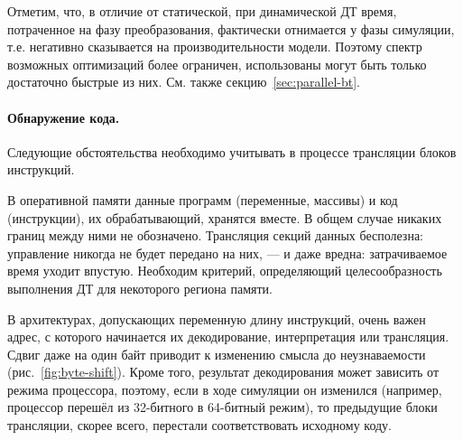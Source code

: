 Отметим, что, в отличие от статической, при динамической ДТ время, потраченное на фазу преобразования, фактически отнимается у фазы симуляции, т.е. негативно сказывается на производительности модели. Поэтому спектр возможных оптимизаций более ограничен, использованы могут быть только достаточно быстрые из них. См. также секцию~\ref{sec:parallel-bt}.

\paragraph{Обнаружение кода.} Следующие обстоятельства необходимо учитывать в процессе трансляции блоков инструкций.

\begin{itemize*}
    \item В оперативной памяти данные программ (переменные, массивы) и код (инструкции), их обрабатывающий, хранятся вместе. В общем случае никаких границ между ними не обозначено. Трансляция секций данных бесполезна: управление никогда не будет передано на них, --- и даже вредна: затрачиваемое время уходит впустую. Необходим критерий, определяющий целесообразность выполнения ДТ для некоторого региона памяти.
    
    \item В архитектурах, допускающих переменную длину инструкций, очень важен адрес, с которого начинается их декодирование, интерпретация или трансляция. Сдвиг даже на один байт приводит к изменению смысла до неузнаваемости (рис.~\ref{fig:byte-shift}). Кроме того, результат декодирования может зависить от режима процессора, поэтому, если в ходе симуляции он изменился (например, процессор перешёл из 32-битного в 64-битный режим), то предыдущие блоки трансляции, скорее всего, перестали соответствовать исходному коду.
\end{itemize*}

